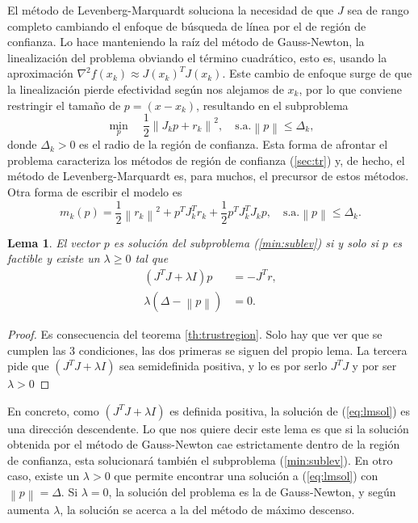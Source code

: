\documentclass[11pt,a4paper]{book}
\newtheorem{lemma}[theorem]{Lema}
\theoremstyle{definition}
\theoremstyle{remark}
\newcommand{\norm}[1]{\left\lVert#1\right\rVert}
\begin{document}
El método de Levenberg-Marquardt soluciona la necesidad de que $J$ sea de rango completo cambiando el enfoque de búsqueda de línea por el de región de confianza.
Lo hace manteniendo la raíz del método de Gauss-Newton, la linealización del problema obviando el término cuadrático, esto es, usando la aproximación $\nabla^2 f(x_k) \approx J(x_k)^TJ(x_k)$.
Este cambio de enfoque surge de que la linealización pierde efectividad según nos alejamos de $x_k$, por lo que conviene restringir el tamaño de $p=(x-x_k)$, resultando en el subproblema
\begin{equation}
\label{min:sublev}
	\min_{p} \quad \frac{1}{2} \norm{J_kp+r_k}^2,\quad \text{s.a.} \norm{p} \leq \Delta_k,
\end{equation}
donde $\Delta_k>0$ es el radio de la región de confianza.
Esta forma de afrontar el problema caracteriza los métodos de región de confianza (\ref{sec:tr}) y,
de hecho, el método de Levenberg-Marquardt es, para muchos, el precursor de estos métodos. Otra forma de escribir el modelo es
\begin{equation}
	m_k(p)=\frac{1}{2}\norm{r_k}^2 + p^TJ_k^Tr_k + \frac{1}{2}p^TJ_k^TJ_kp,
	\quad \text{s.a.} \norm{p} \leq \Delta_k.
\end{equation}

\begin{lemma}
El vector $p$ es solución del subproblema (\ref{min:sublev}) si y solo si $p$ es factible y existe un $\lambda \geq 0$ tal que
\begin{align}
	(J^TJ+\lambda I)p&=-J^Tr, \label{eq:lmsol}\\
	\lambda (\Delta-\norm{p})&=0.
\end{align}
\end{lemma}
\begin{proof}
Es consecuencia del teorema \ref{th:trustregion}. Solo hay que ver que se cumplen las 3 condiciones, las dos primeras se siguen del propio lema. La tercera pide que $(J^TJ+\lambda I)$ sea semidefinida positiva, y lo es por serlo $J^TJ$ y por ser $\lambda>0$
\end{proof}

En concreto, como $(J^TJ+\lambda I)$ es definida positiva, la solución de (\ref{eq:lmsol}) es una dirección descendente. Lo que nos quiere decir este lema es que si la solución obtenida por el método de Gauss-Newton cae estrictamente dentro de la región de confianza, esta solucionará también el subproblema (\ref{min:sublev}).
En otro caso, existe un $\lambda>0$ que permite encontrar una solución a (\ref{eq:lmsol})
con $\norm{p}=\Delta$. Si $\lambda=0$, la solución del problema es la de Gauss-Newton, y según aumenta $\lambda$, la solución se acerca a la del método de máximo descenso.
\end{document}
